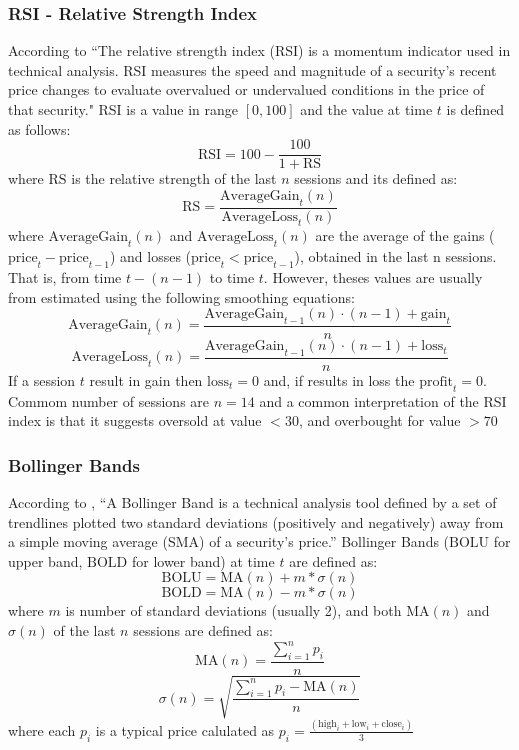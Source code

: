 \documentclass{article}
\begin{document}
\subsubsection*{RSI - Relative Strength Index}
According to \cite{rsi} ``The relative strength index (RSI) is a momentum indicator used in technical analysis. 
RSI measures the speed and magnitude of a security's recent price changes to evaluate overvalued or 
undervalued conditions in the price of that security."
RSI is a value in range $[0, 100]$ and the value at time $t$ is defined as follows:
$$
    \text{RSI} = 100 - \frac{100}{1 + \text{RS}}
$$
where $\text{RS}$ is the relative strength of the last $n$ sessions and its defined as:
$$
    \text{RS} = \frac{\text{AverageGain}_t(n)}{\text{AverageLoss}_t(n)}
$$
where $\text{AverageGain}_t(n)$ and $\text{AverageLoss}_t(n)$ are the average of the gains ($\text{price}_t - \text{price}_{t-1}$) 
and losses ($\text{price}_t < \text{price}_{t-1}$), obtained in the last n sessions. That is, from time $t - (n - 1)$ to time $t$. 
However, theses values are usually from estimated using the following smoothing equations:
$$
    \text{AverageGain}_t(n) = \frac{\text{AverageGain}_{t-1}(n) \cdot (n-1) + \text{gain}_t}{n}
$$ 
$$
    \text{AverageLoss}_t(n) = \frac{\text{AverageGain}_{t-1}(n) \cdot (n-1) + \text{loss}_t}{n}
$$ 
If a session $t$ result in gain then $\text{loss}_t = 0$ and, if results in loss the $\text{profit}_t = 0$. Commom number of sessions
are $n = 14$ and a common interpretation of the RSI index is that it suggests oversold at value $< 30$, and overbought for value $ > 70$ 

\subsubsection*{Bollinger Bands}
According to \cite{bb}, ``A Bollinger Band is a technical analysis tool defined by a set of trendlines plotted two standard deviations
(positively and negatively) away from a simple moving average (SMA) of a security's price.'' 
Bollinger Bands ($\text{BOLU}$ for upper band, $\text{BOLD}$ for lower band) at time $t$ are defined as:
$$
\text{BOLU} = \text{MA}(n) + m * \sigma(n)
$$
$$
\text{BOLD} = \text{MA}(n) - m * \sigma(n)
$$
where $m$ is number of standard deviations (usually 2), and both $\text{MA}(n)$ and $\sigma(n)$ of the last $n$ sessions are defined as:
$$
\text{MA}(n) = \frac{\sum_{i = 1}^{n}{p_i}}{n}
$$
$$
\sigma(n) = \sqrt{\frac{\sum_{i = 1}^{n}{p_i - \text{MA}(n)}}{n}}
$$
where each $p_i$ is a typical price calulated as $p_i = \frac{(\text{high}_i + \text{low}_i + \text{close}_i)}{3}$
\end{document}
